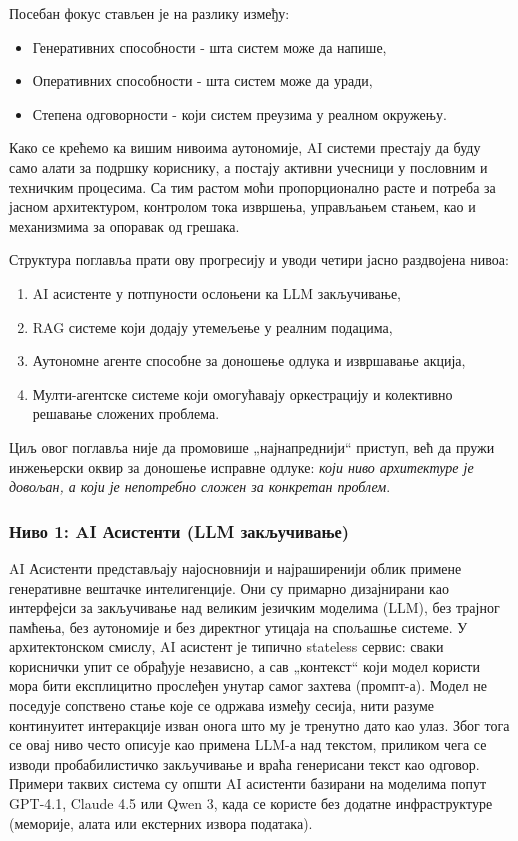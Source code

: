 Посебан фокус стављен је на разлику између:
\begin{itemize}
    \item Генеративних способности - шта систем може да напише,
    \item Оперативних способности - шта систем може да уради,
    \item Степена одговорности - који систем преузима у реалном окружењу.
\end{itemize}
\noindent
Како се крећемо ка вишим нивоима аутономије, AI системи престају да буду само алати за подршку кориснику,
а постају активни учесници у пословним и техничким процесима.
Са тим растом моћи пропорционално расте и потреба за јасном архитектуром, контролом тока извршења,
управљањем стањем, као и механизмима за опоравак од грешака.

Структура поглавља прати ову прогресију и уводи четири јасно раздвојена нивоа:
\begin{enumerate}
    \item AI асистенте у потпуности ослоњени ка LLM закључивање,
    \item RAG системе који додају утемељење у реалним подацима,
    \item Аутономне агенте способне за доношење одлука и извршавање акција,
    \item Мулти-агентске системе који омогућавају оркестрацију и колективно решавање сложених проблема.
\end{enumerate}
\noindent
Циљ овог поглавља није да промовише „најнапреднији“ приступ, већ да пружи инжењерски оквир за доношење
исправне одлуке: \textit{који ниво архитектуре је довољан, а који је непотребно сложен за конкретан проблем}.


\subsubsection*{Ниво 1: AI Асистенти (LLM закључивање)}

AI Асистенти представљају најосновнији и најраширенији облик примене генеративне вештачке интелигенције.
Они су примарно дизајнирани као интерфејси за закључивање над великим језичким моделима (LLM),
без трајног памћења, без аутономије и без директног утицаја на спољашње системе.
У архитектонском смислу, AI асистент је типично stateless сервис:
сваки кориснички упит се обрађује независно, а сав „контекст“ који модел користи мора бити експлицитно
прослеђен унутар самог захтева (промпт-а).
Модел не поседује сопствено стање које се одржава између сесија, нити разуме континуитет интеракције
изван онога што му је тренутно дато као улаз.
Због тога се овај ниво често описује као примена LLM-а над текстом, приликом чега се
изводи пробабилистичко закључивање и враћа генерисани текст као одговор.
Примери таквих система су општи AI асистенти базирани на моделима попут GPT-4.1, Claude 4.5 или Qwen 3,
када се користе без додатне инфраструктуре (меморије, алата или екстерних извора података).

